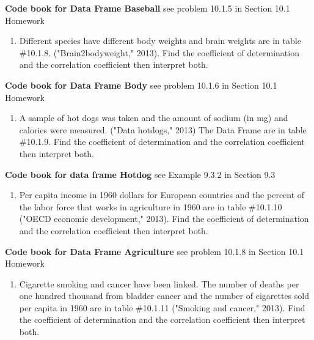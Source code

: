 \documentclass[]{book}
\providecommand{\tightlist}{%
  \setlength{\itemsep}{0pt}\setlength{\parskip}{0pt}}
\begin{document}
\textbf{Code book for Data Frame Baseball} see problem 10.1.5 in Section 10.1 Homework

\begin{enumerate}
\def\labelenumi{\arabic{enumi}.}
\setcounter{enumi}{5}
\tightlist
\item
  Different species have different body weights and brain weights are in table \#10.1.8. ("Brain2bodyweight," 2013). Find the coefficient of determination and the correlation coefficient then interpret both.
\end{enumerate}

\textbf{Code book for Data Frame Body} see problem 10.1.6 in Section 10.1 Homework

\begin{enumerate}
\def\labelenumi{\arabic{enumi}.}
\setcounter{enumi}{6}
\tightlist
\item
  A sample of hot dogs was taken and the amount of sodium (in mg) and calories were measured. ("Data hotdogs," 2013) The Data Frame are in table \#10.1.9. Find the coefficient of determination and the correlation coefficient then interpret both.
\end{enumerate}

\textbf{Code book for data frame Hotdog} see Example 9.3.2 in Section 9.3

\begin{enumerate}
\def\labelenumi{\arabic{enumi}.}
\setcounter{enumi}{7}
\tightlist
\item
  Per capita income in 1960 dollars for European countries and the percent of the labor force that works in agriculture in 1960 are in table \#10.1.10 ("OECD economic development," 2013). Find the coefficient of determination and the correlation coefficient then interpret both.
\end{enumerate}

\textbf{Code book for Data Frame Agriculture} see problem 10.1.8 in Section 10.1 Homework

\begin{enumerate}
\def\labelenumi{\arabic{enumi}.}
\setcounter{enumi}{8}
\tightlist
\item
  Cigarette smoking and cancer have been linked. The number of deaths per one hundred thousand from bladder cancer and the number of cigarettes sold per capita in 1960 are in table \#10.1.11 ("Smoking and cancer," 2013). Find the coefficient of determination and the correlation coefficient then interpret both.
\end{enumerate}
\end{document}
